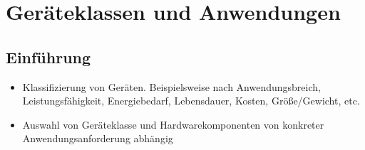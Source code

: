 \section{Geräteklassen und Anwendungen}

\subsection{Einführung}
\begin{itemize}
	\item Klassifizierung von Geräten. Beispielsweise nach Anwendungsbreich, Leistungsfähigkeit, Energiebedarf, Lebensdauer, Kosten, Größe/Gewicht, etc.
	\item Auswahl von Geräteklasse und Hardwarekomponenten von konkreter Anwendungsanforderung abhängig
\end{itemize}


